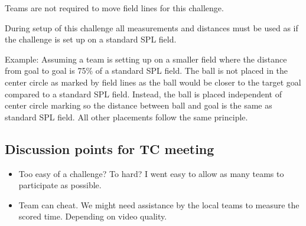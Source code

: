 Teams are not required to move field lines for this challenge.

During setup of this challenge all measurements and distances must be used as if the challenge is set up on a standard SPL field.

Example: Assuming a team is setting up on a smaller field where the distance from goal to goal is 75\% of a standard SPL field. The ball is not placed in the center circle as marked by field lines as the ball would be closer to the target goal compared to a standard SPL field. Instead, the ball is placed independent of center circle marking so the distance between ball and goal is the same as standard SPL field. All other placements follow the same principle.

\subsection{Discussion points for TC meeting}

\begin{itemize}
	\item Too easy of a challenge? To hard? I went easy to allow as many teams to participate as possible.
	\item Team can cheat. We might need assistance by the local teams to measure the scored time. Depending on video quality.
\end{itemize}
